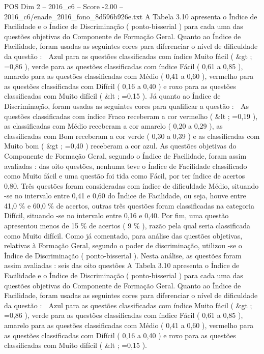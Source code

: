 \begin{textsample}{POS Dim 2 – 2016\_c6 – Score -2.00 – 2016\_c6/enade\_2016\_fono\_8d596b926e.txt}
A Tabela 3.10 apresenta o Índice de Facilidade e o Índice de Discriminação ( ponto-bisserial ) para cada uma das questões objetivas do Componente de Formação Geral.
Quanto ao Índice de Facilidade, foram usadas as seguintes cores para diferenciar o nível de dificuldade da questão :  Azul para as questões classificadas com índice Muito fácil ( \&gt ; =0,86 ), verde para as questões classificadas com índice Fácil ( 0,61 a 0,85 ), amarelo para as questões classificadas com Médio ( 0,41 a 0,60 ), vermelho para as questões classificadas com Difícil ( 0,16 a 0,40 ) e roxo para as questões classificadas com Muito difícil ( \&lt ; =0,15 ).
Já quanto ao Índice de Discriminação, foram usadas as seguintes cores para qualificar a questão :  As questões classificadas com índice Fraco receberam a cor vermelho ( \&lt ; =0,19 ), as classificadas com Médio receberam a cor amarelo ( 0,20 a 0,29 ), as classificadas com Bom receberam a cor verde ( 0,30 a 0,39 ) e as classificadas com Muito bom ( \&gt ; =0,40 ) receberam a cor azul.
As questões objetivas do Componente de Formação Geral, segundo o Índice de Facilidade, foram assim avaliadas : das oito questões, nenhuma teve o Índice de Facilidade classificado como Muito fácil e uma questão foi tida como Fácil, por ter índice de acertos 0,80.
Três questões foram consideradas com índice de dificuldade Médio, situando -se no intervalo entre 0,41 e 0,60 do Índice de Facilidade, ou seja, houve entre 41,0 \% e 60,0 \% de acertos, outras três questões foram classificadas na categoria Difícil, situando -se no intervalo entre 0,16 e 0,40.
Por fim, uma questão apresentou menos de 15 \% de acertos ( 9 \% ), razão pela qual seria classificada como Muito difícil.
Como já comentado, para análise das questões objetivas, relativas à Formação Geral, segundo o poder de discriminação, utilizou -se o Índice de Discriminação ( ponto-bisserial ).
Nesta análise, as questões foram assim avaliadas : seis das oito questões A Tabela 3.10 apresenta o Índice de Facilidade e o Índice de Discriminação ( ponto-bisserial ) para cada uma das questões objetivas do Componente de Formação Geral.
Quanto ao Índice de Facilidade, foram usadas as seguintes cores para diferenciar o nível de dificuldade da questão :  Azul para as questões classificadas com índice Muito fácil ( \&gt ; =0,86 ), verde para as questões classificadas com índice Fácil ( 0,61 a 0,85 ), amarelo para as questões classificadas com Médio ( 0,41 a 0,60 ), vermelho para as questões classificadas com Difícil ( 0,16 a 0,40 ) e roxo para as questões classificadas com Muito difícil ( \&lt ; =0,15 ).

\end{textsample}
